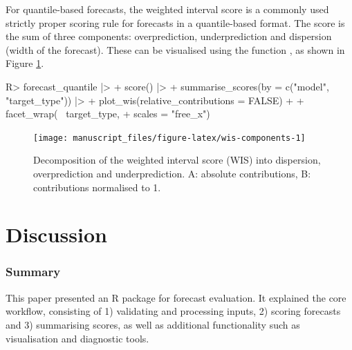 \documentclass[
]{jss}
\begin{document}
For quantile-based forecasts, the weighted interval score
\citep[WIS, ][see Section \ref{sec:wis} in the Appendix]{bracherEvaluatingEpidemicForecasts2021}
is a commonly used strictly proper scoring rule for forecasts in a
quantile-based format. The score is the sum of three components:
overprediction, underprediction and dispersion (width of the forecast).
These can be visualised using the function , as shown
in Figure \ref{fig:wis-components}.

\begin{CodeChunk}
\begin{CodeInput}
R> forecast_quantile |>
+   score() |>
+   summarise_scores(by = c("model", "target_type")) |>
+   plot_wis(relative_contributions = FALSE) + 
+   facet_wrap(~ target_type, 
+              scales = "free_x") 
\end{CodeInput}
\end{CodeChunk}

\begin{CodeChunk}
\begin{figure}[!h]

{\centering \texttt{[image: manuscript\_files/figure-latex/wis-components-1]} 

}

\caption[Decomposition of the weighted interval score (WIS) into dispersion, overprediction and underprediction]{Decomposition of the weighted interval score (WIS) into dispersion, overprediction and underprediction. A: absolute contributions, B: contributions normalised to 1.}\label{fig:wis-components}
\end{figure}
\end{CodeChunk}

\section{Discussion} \label{sec:discussion}

\subsubsection{Summary}\label{summary}

This paper presented  an R package for forecast
evaluation. It explained the core workflow, consisting of 1) validating
and processing inputs, 2) scoring forecasts and 3) summarising scores,
as well as additional functionality such as visualisation and diagnostic
tools.
\end{document}
